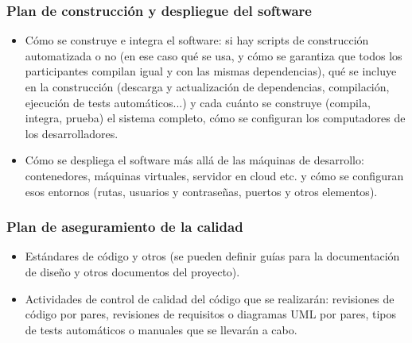\documentclass[12pt]{article}%
\begin{document}
\subsubsection{Plan de construcci\'on y despliegue del software}

\begin{itemize}
	\item C\'omo se construye e integra el software: si hay scripts de construcci\'on automatizada o no (en ese caso qu\'e se usa, y c\'omo se garantiza que todos los participantes compilan igual y con las mismas dependencias), qu\'e se incluye en la construcci\'on (descarga y actualizaci\'on de dependencias, compilaci\'on, ejecuci\'on de tests autom\'aticos...) y cada cu\'anto se construye (compila, integra, prueba) el sistema completo, c\'omo se configuran los computadores de los desarrolladores.
	\item C\'omo se despliega el software m\'as all\'a de las m\'aquinas de desarrollo: contenedores, m\'aquinas virtuales, servidor en cloud etc. y c\'omo se configuran esos entornos (rutas, usuarios y contrase\~nas, puertos y otros elementos).
\end{itemize}

\subsubsection{Plan de aseguramiento de la calidad}

\begin{itemize}
	\item Est\'andares de c\'odigo y otros (se pueden definir gu\'ias para la documentaci\'on de dise\~no y otros documentos del proyecto).
	\item Actividades de control de calidad del c\'odigo que se realizar\'an: revisiones de c\'odigo por pares, revisiones de requisitos o diagramas UML por pares, tipos de tests autom\'aticos o manuales que se llevar\'an a cabo.
\end{itemize}
\end{document}

